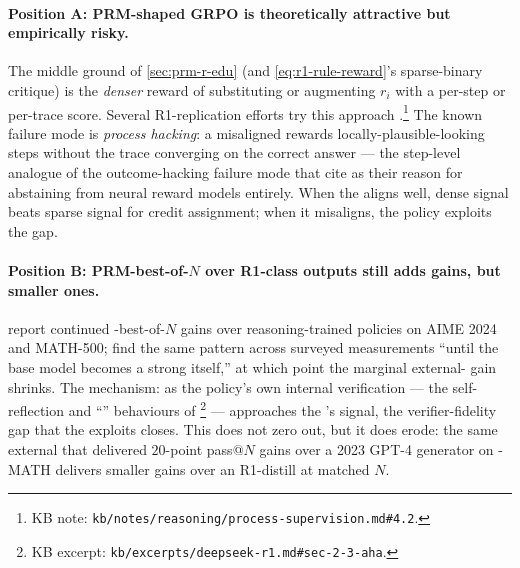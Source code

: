 \paragraph{Position A: PRM-shaped GRPO is theoretically attractive but
empirically risky.} The middle ground of
\cref{sec:prm-r-edu} (and
\cref{eq:r1-rule-reward}'s sparse-binary critique) is the
\emph{denser} reward of substituting or augmenting $r_i$ with a
per-step or per-trace  score. Several R1-replication
efforts try this approach
\citep[\S 4]{thinkprm2025}.\footnote{KB note:
\texttt{kb/notes/reasoning/process-supervision.md\#4.2}.} The known
failure mode is \emph{process hacking}: a misaligned  rewards
locally-plausible-looking steps without the trace converging on the
correct answer --- the step-level analogue of the outcome-hacking
failure mode that \citet[\S 2.2]{deepseek-r1} cite as their reason for
abstaining from neural reward models entirely. When the  aligns
well, dense signal beats sparse signal for credit assignment; when it
misaligns, the policy exploits the gap.

\paragraph{Position B: PRM-best-of-$N$ over R1-class outputs still
adds gains, but smaller ones.}  report continued
-best-of-$N$ gains over reasoning-trained policies on AIME 2024
and MATH-500; \citet{zheng2025-prm-survey} find the same pattern
across surveyed measurements ``until the base model becomes a strong
 itself,'' at which point the marginal external-
gain shrinks. The
mechanism: as the policy's own internal verification --- the
self-reflection and ``'' behaviours of
\citet[\S 2.3]{deepseek-r1}\footnote{KB excerpt:
\texttt{kb/excerpts/deepseek-r1.md\#sec-2-3-aha}.} --- approaches the
's signal, the verifier-fidelity gap that the  exploits closes.
This does not zero out, but it does erode: the same external  that
delivered $20$-point pass@$N$ gains over a 2023 GPT-4 generator on
-MATH delivers smaller gains over an R1-distill at matched $N$.

